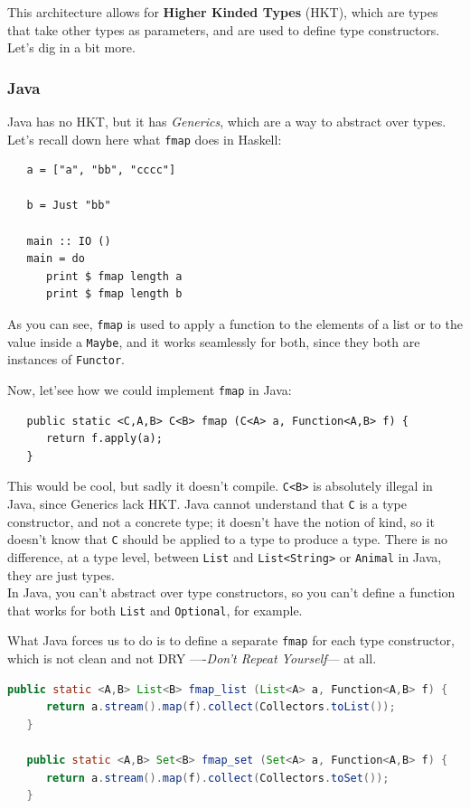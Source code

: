 This architecture allows for \textbf{Higher Kinded Types} (HKT), which are types that take other types as parameters, and are used to define type constructors.
Let's dig in a bit more.

\subsubsection{Java}
Java has no HKT, but it has \textit{Generics}, which are a way to abstract over types. Let's recall down here what \lstinline|fmap| does in Haskell:
\begin{lstlisting}
   a = ["a", "bb", "cccc"]

   b = Just "bb"
   
   main :: IO ()
   main = do
      print $ fmap length a
      print $ fmap length b
\end{lstlisting}
As you can see, \lstinline|fmap| is used to apply a function to the elements of a list or to the value inside a \lstinline|Maybe|, and it works seamlessly for both, since they both are instances of \lstinline|Functor|.

Now, let'see how we could implement \lstinline|fmap| in Java:
\begin{lstlisting}
   public static <C,A,B> C<B> fmap (C<A> a, Function<A,B> f) {
      return f.apply(a);
   }
\end{lstlisting}

This would be cool, but sadly it doesn't compile. \lstinline|C<B>| is absolutely illegal in Java, since Generics lack HKT.
Java cannot understand that \lstinline|C| is a type constructor, and not a concrete type; it doesn't have the notion of kind, so it doesn't know that \lstinline|C| should be applied to a type to produce a type.
There is no difference, at a type level, between \lstinline|List| and \lstinline|List<String>| or \lstinline|Animal| in Java, they are just types.\\
In Java, you can't abstract over type constructors, so you can't define a function that works for both \lstinline|List| and \lstinline|Optional|, for example.

What Java forces us to do is to define a separate \lstinline|fmap| for each type constructor, which is not clean and not DRY ----\textit{Don't Repeat Yourself}--- at all.
\begin{lstlisting}[language=Java]
   public static <A,B> List<B> fmap_list (List<A> a, Function<A,B> f) {
      return a.stream().map(f).collect(Collectors.toList());
   }

   public static <A,B> Set<B> fmap_set (Set<A> a, Function<A,B> f) {
      return a.stream().map(f).collect(Collectors.toSet());
   }
\end{lstlisting}

